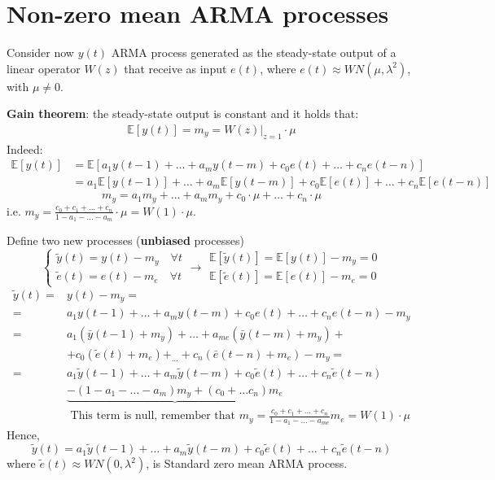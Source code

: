 \section{Non-zero mean ARMA processes}
Consider now $y(t)$ ARMA process generated as the steady-state output of a linear operator $W(z)$ that receive as input $e(t)$, where $e(t) \approx W N\left(\mu, \lambda^{2}\right)$, with $\mu\neq0$.

\textbf{Gain theorem}: the steady-state output is constant and it holds that:
\begin{align*}
	\mathbb{E}[y(t)]=m_{y}=W(z)|_{z=1} \cdot \mu
\end{align*}
Indeed:
\begin{align*}
		\mathbb{E}[y(t)] &=\mathbb{E}\left[a_{1} y(t-1)+\ldots+a_{m} y(t-m)+c_{0} e(t)+\ldots+c_{n} e(t-n)\right] \\
		&=a_{1} \mathbb{E}[y(t-1)]+\ldots+a_{m} \mathbb{E}[y(t-m)]+c_{0} \mathbb{E}[e(t)]+\ldots+c_{n} \mathbb{E}[e(t-n)]
\end{align*}
	$$
	m_{y}=a_{1} m_{y}+\ldots+a_{m} m_{y}+c_{0} \cdot \mu+\ldots+c_{n} \cdot \mu
	$$
	i.e. $m_{y}=\frac{c_{0}+c_{1}+\ldots+c_{n}}{1-a_{1}-\ldots-a_{m}} \cdot \mu=W(1) \cdot \mu$.
	
Define two new processes (\textbf{unbiased} processes)
$$
\left\{\begin{array}{l}
	\tilde{y}(t)=y(t)-m_{y} \quad\forall t\\
	\tilde{e}(t)=e(t)-m_{e} \quad\forall t
\end{array} \rightarrow \begin{array}{l}
	\mathbb{E}[\tilde{y}(t)]=\mathbb{E}[y(t)]-m_{y}=0 \\
	\mathbb{E}[\tilde{e}(t)]=\mathbb{E}[e(t)]-m_{e}=0
\end{array}\right.
$$
\begin{align*}
	\tilde{y}(t)=& y(t)-m_{y}=\\
	=& a_{1} y(t-1)+\ldots+a_{m} y(t-m)+c_{0} e(t)+\ldots+c_{n} e(t-n)-m_{y} \\
	=& a_{1}\left(\bar{y}(t-1)+m_{y}\right)+\ldots+a_{m e}\left(\bar{y}(t-m)+m_{y}\right)+\\
	&+c_{0}\left(\tilde{e}(t)+m_{e}\right)+_{\ldots}+c_{n}\left(\bar{e}(t-n)+m_{e}\right)-m_{y}= \\
	=& a_{1} \tilde{y}(t-1)+\ldots+a_{m} \tilde{y}(t-m)+c_{0} \tilde{e}(t)+\ldots+c_{n} \tilde{e}(t-n) \\
	&\underbrace{-\left(1-a_{1}-\ldots-a_{m}\right) m_{y}+\left(c_{0}+\ldots c_{n}\right) m_{e}} \\
	& \text { This term is null, remember that } m_{y}=\frac{c_{0}+c_{1}+\ldots+c_{n}}{1-a_{1}-\ldots-a_{m e}} m_{e}=W(1) \cdot \mu
\end{align*}
Hence,
$$
\tilde{y}(t)=a_{1} \tilde{y}(t-1)+\ldots+a_{m} \tilde{y}(t-m)+c_{0} \tilde{e}(t)+\ldots+c_{n} \tilde{e}(t-n)
$$
where $\tilde{e}(t)\approx W N\left(0, \lambda^{2}\right)$, is Standard zero mean ARMA process.

